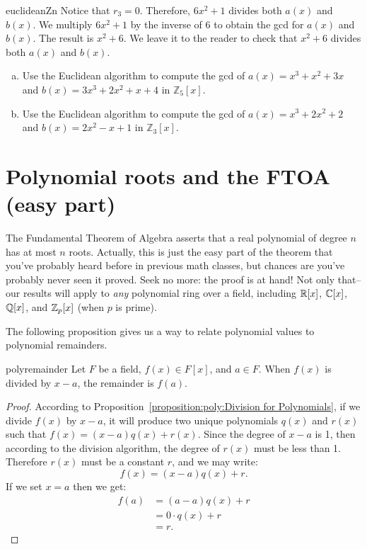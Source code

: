 \begin{example}{euclideanZn}
Notice that $r_3=0$. Therefore, $6x^2 + 1$ divides both $a(x)$ and $b(x)$. We multiply $6x^2 + 1$ by the inverse of 6 to obtain the gcd for $a(x)$ and $b(x)$. The result is $x^2+6$. We leave it to the reader to check that $x^2+6$ divides both $a(x)$ and $b(x)$.
\end{example}

\begin{exercise}{}
\begin{enumerate}[(a)]
\item
Use the Euclidean algorithm to compute the gcd of $a(x)=x^3+x^2+3x$ and  $b(x)=3x^3+2x^2+x+4$ in $\mathbb{Z}_5[x]$.
\item
Use the Euclidean algorithm to compute the gcd of $a(x)=x^3+2x^2+2$ and  $b(x)=2x^2-x+1$ in $\mathbb{Z}_3[x]$. 
\end{enumerate}
\end{exercise}

\section{Polynomial roots and the FTOA (easy part) \quad                                      
{}}\label{FTOA}
The Fundamental Theorem of Algebra asserts that a real polynomial of degree $n$ has at most $n$ roots. Actually, this is just the easy part of the theorem that you've probably heard before in previous math classes, but chances are you've probably never seen it proved. Seek no more: the proof is at hand! Not only that--our results will apply to  \emph{any} polynomial ring over a field, including $\mathbb{R}[x]$, $\mathbb{C}[x]$, $\mathbb{Q}[x]$, and $\mathbb{Z}_p[x]$ (when $p$ is prime).  

The following proposition gives us a way to relate polynomial values to polynomial remainders.

\begin{prop}{polyremainder}
Let $F$ be a field, $f(x) \in F[x]$, and $a \in F$. When $f(x)$ is divided by $x-a$, the remainder is $f(a)$.
\end {prop}

\begin{proof}
According to Proposition~\ref{proposition:poly:Division for Polynomials}, if we divide $f(x)$ by $x-a$, it will produce two unique polynomials $q(x)$ and $r(x)$ such that $f(x) = (x-a)q(x) + r(x)$.  Since the degree of $x-a$ is 1, then according to the division algorithm, the degree of $r(x)$ must be less than 1.  Therefore $r(x)$ must be a constant $r$, and we may write:
\[f(x) = (x-a)q(x) + r.\]
If we set $x=a$ then we get:
\begin{align*}
f(a) &= (a-a)q(x) + r\\
& = 0 \cdot q(x) + r \\
& = r.
\end{align*}
\end {proof}

